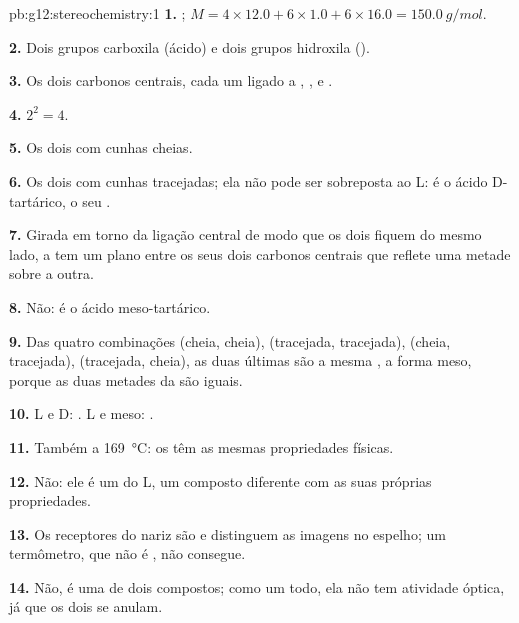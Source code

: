 \begin{solution}{pb:g12:stereochemistry:1}
\textbf{1.} ; $M = 4 \times 12.0 + 6 \times 1.0 + 6 \times 16.0
= \qty{150.0}{g/mol}$.

\textbf{2.} Dois grupos carboxila (ácido) e dois grupos hidroxila
().

\textbf{3.} Os dois carbonos centrais, cada um ligado a ,
,  e .

\textbf{4.} $2^2 = 4$.

\textbf{5.} Os dois com cunhas cheias.

\textbf{6.} Os dois  com cunhas tracejadas; ela não pode ser
sobreposta ao L: é o ácido D-tartárico, o seu .

\textbf{7.} Girada em torno da ligação central de modo que os dois
 fiquem do mesmo lado, a  tem um plano entre os seus dois
carbonos centrais que reflete uma metade sobre a outra.

\textbf{8.} Não: é o ácido meso-tartárico.

\textbf{9.} Das quatro combinações (cheia, cheia), (tracejada,
tracejada), (cheia, tracejada), (tracejada, cheia), as duas últimas são
a mesma , a forma meso, porque as duas metades da  são
iguais.

\textbf{10.} L e D: . L e meso: .

\textbf{11.} Também a \qty{169}{\celsius}: os  têm as mesmas
propriedades físicas.

\textbf{12.} Não: ele é um  do L, um composto diferente
com as suas próprias propriedades.

\textbf{13.} Os receptores do nariz são  e distinguem as imagens
no espelho; um termômetro, que não é , não consegue.

\textbf{14.} Não, é uma  de dois compostos; como um todo, ela não
tem atividade óptica, já que os dois  se anulam.


\end{solution}
